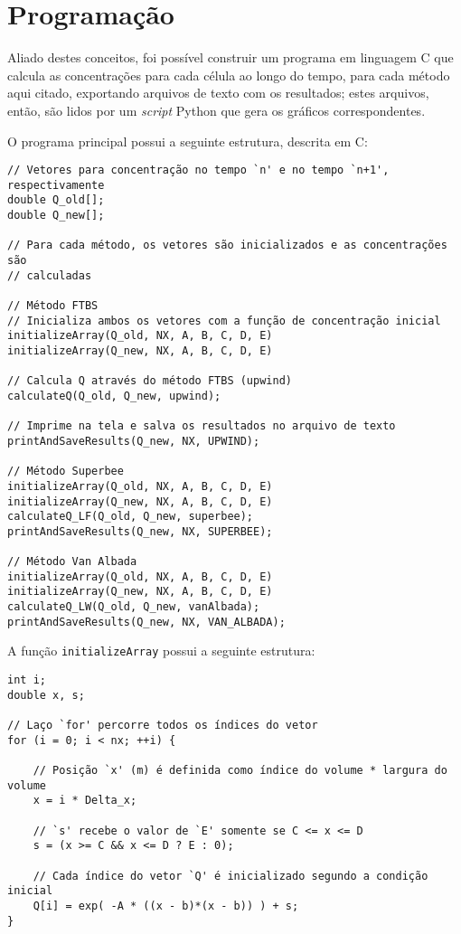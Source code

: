 \section{Programação}
Aliado destes conceitos, foi possível construir um programa em linguagem C que
calcula as concentrações para cada célula ao longo do tempo, para cada método
aqui citado, exportando arquivos de texto com os resultados; estes arquivos,
então, são lidos por um \textit{script} Python que gera os gráficos
correspondentes.

O programa principal possui a seguinte estrutura, descrita em C:

\begin{Verbatim}[fontsize=\footnotesize]
// Vetores para concentração no tempo `n' e no tempo `n+1', respectivamente
double Q_old[];
double Q_new[];

// Para cada método, os vetores são inicializados e as concentrações são
// calculadas

// Método FTBS
// Inicializa ambos os vetores com a função de concentração inicial
initializeArray(Q_old, NX, A, B, C, D, E)
initializeArray(Q_new, NX, A, B, C, D, E)

// Calcula Q através do método FTBS (upwind)
calculateQ(Q_old, Q_new, upwind);

// Imprime na tela e salva os resultados no arquivo de texto
printAndSaveResults(Q_new, NX, UPWIND);

// Método Superbee
initializeArray(Q_old, NX, A, B, C, D, E)
initializeArray(Q_new, NX, A, B, C, D, E)
calculateQ_LF(Q_old, Q_new, superbee);
printAndSaveResults(Q_new, NX, SUPERBEE);

// Método Van Albada
initializeArray(Q_old, NX, A, B, C, D, E)
initializeArray(Q_new, NX, A, B, C, D, E)
calculateQ_LW(Q_old, Q_new, vanAlbada);
printAndSaveResults(Q_new, NX, VAN_ALBADA);
\end{Verbatim}

\noindent A função \verb|initializeArray| possui a seguinte estrutura:
\begin{Verbatim}[fontsize=\footnotesize]
int i;
double x, s;

// Laço `for' percorre todos os índices do vetor
for (i = 0; i < nx; ++i) {

    // Posição `x' (m) é definida como índice do volume * largura do volume
    x = i * Delta_x;

    // `s' recebe o valor de `E' somente se C <= x <= D
    s = (x >= C && x <= D ? E : 0);

    // Cada índice do vetor `Q' é inicializado segundo a condição inicial
    Q[i] = exp( -A * ((x - b)*(x - b)) ) + s;
}
\end{Verbatim}

